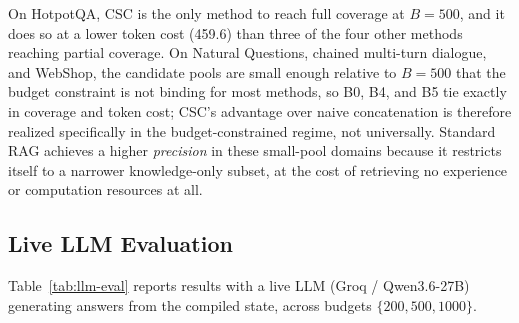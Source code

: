 \documentclass{article}
\begin{document}
On HotpotQA, CSC is the only method to reach full coverage at $B=500$, and it does so at a lower token cost (459.6) than three of the four other methods reaching partial coverage. On Natural Questions, chained multi-turn dialogue, and WebShop, the candidate pools are small enough relative to $B=500$ that the budget constraint is not binding for most methods, so B0, B4, and B5 tie exactly in coverage and token cost; CSC's advantage over naive concatenation is therefore realized specifically in the budget-constrained regime, not universally. Standard RAG achieves a higher \emph{precision} in these small-pool domains because it restricts itself to a narrower knowledge-only subset, at the cost of retrieving no experience or computation resources at all.

\subsection{Live LLM Evaluation}
Table~\ref{tab:llm-eval} reports results with a live LLM (Groq / Qwen3.6-27B) generating answers from the compiled state, across budgets $\{200, 500, 1000\}$.
\end{document}
